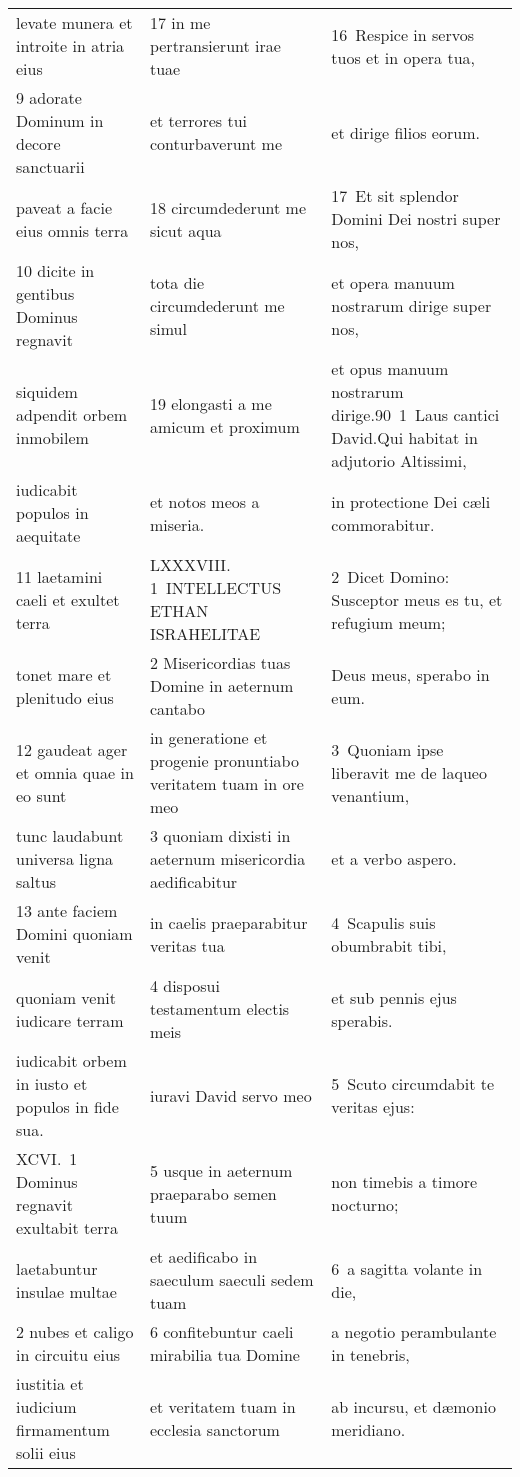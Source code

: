 \documentclass{article}
\begin{document}
\begin{longtable}{@{}p{}p{}p{}@{}}
levate munera et introite in atria eius	&	17 in me pertransierunt irae tuae	&	16 Respice in servos tuos et in opera tua,	\\
9 adorate Dominum in decore sanctuarii	&	et terrores tui conturbaverunt me	&	et dirige filios eorum.	\\
paveat a facie eius omnis terra	&	18 circumdederunt me sicut aqua	&	17 Et sit splendor Domini Dei nostri super nos,	\\
10 dicite in gentibus Dominus regnavit	&	tota die circumdederunt me simul	&	et opera manuum nostrarum dirige super nos,	\\
siquidem adpendit orbem inmobilem	&	19 elongasti a me amicum et proximum	&	et opus manuum nostrarum dirige.90 1 Laus cantici David.Qui habitat in adjutorio Altissimi,	\\
iudicabit populos in aequitate	&	et notos meos a miseria.	&	in protectione Dei cæli commorabitur.	\\
11 laetamini caeli et exultet terra	&	LXXXVIII. 1 INTELLECTUS ETHAN ISRAHELITAE	&	2 Dicet Domino: Susceptor meus es tu, et refugium meum;	\\
tonet mare et plenitudo eius	&	2 Misericordias tuas Domine in aeternum cantabo	&	Deus meus, sperabo in eum.	\\
12 gaudeat ager et omnia quae in eo sunt	&	in generatione et progenie pronuntiabo veritatem tuam in ore meo	&	3 Quoniam ipse liberavit me de laqueo venantium,	\\
tunc laudabunt universa ligna saltus	&	3 quoniam dixisti in aeternum misericordia aedificabitur	&	et a verbo aspero.	\\
13 ante faciem Domini quoniam venit	&	in caelis praeparabitur veritas tua	&	4 Scapulis suis obumbrabit tibi,	\\
quoniam venit iudicare terram	&	4 disposui testamentum electis meis	&	et sub pennis ejus sperabis.	\\
iudicabit orbem in iusto et populos in fide sua.	&	iuravi David servo meo	&	5 Scuto circumdabit te veritas ejus:	\\
XCVI. 1 Dominus regnavit exultabit terra	&	5 usque in aeternum praeparabo semen tuum	&	non timebis a timore nocturno;	\\
laetabuntur insulae multae	&	et aedificabo in saeculum saeculi sedem tuam	&	6 a sagitta volante in die,	\\
2 nubes et caligo in circuitu eius	&	6 confitebuntur caeli mirabilia tua Domine	&	a negotio perambulante in tenebris,	\\
iustitia et iudicium firmamentum solii eius	&	et veritatem tuam in ecclesia sanctorum	&	ab incursu, et dæmonio meridiano.	\\

\end{longtable}
\end{document}
